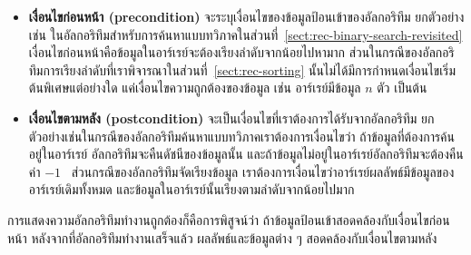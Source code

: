 \begin{itemize}
\item {\bf เงื่อนไข{\wbr}ก่อนหน้า (precondition)}
  จะ{\wbr}ระบุ{\wbr}เงื่อนไข{\wbr}ของ{\wbr}ข้อมูล{\wbr}ป้อน{\wbr}เข้า{\wbr}ของ{\wbr}อัล{\wbr}กอ{\wbr}ริ{\wbr}ทึม ยก{\wbr}ตัวอย่าง{\wbr}เช่น{\wbr}
  ใน{\wbr}อัล{\wbr}กอ{\wbr}ริ{\wbr}ทึม{\wbr}สำหรับ{\wbr}การ{\wbr}ค้นหา{\wbr}แบบ{\wbr}ทวิภาค{\wbr}ใน{\wbr}ส่วน{\wbr}ที่~\ref{sect:rec-binary-search-revisited}
  เงื่อนไข{\wbr}ก่อนหน้า{\wbr}คือ{\wbr}ข้อมูล{\wbr}ใน{\wbr}อาร์เรย์{\wbr}จะ{\wbr}ต้อง{\wbr}เรียงลำดับ{\wbr}จาก{\wbr}น้อย{\wbr}ไป{\wbr}หา{\wbr}มาก{\wbr}
  ส่วน{\wbr}ใน{\wbr}กรณี{\wbr}ของ{\wbr}อัล{\wbr}กอ{\wbr}ริ{\wbr}ทึม{\wbr}การ{\wbr}เรียงลำดับ{\wbr}ที่{\wbr}เรา{\wbr}พิจารณา{\wbr}ใน{\wbr}ส่วน{\wbr}ที่~\ref{sect:rec-sorting}
  นั้น{\wbr}ไม่{\wbr}ได้{\wbr}มี{\wbr}การ{\wbr}กำหนด{\wbr}เงื่อนไข{\wbr}เริ่มต้น{\wbr}พิเศษ{\wbr}แต่อย่างใด แค่{\wbr}เงื่อนไข{\wbr}ความ{\wbr}ถูกต้อง{\wbr}ของ{\wbr}ข้อมูล เช่น{\wbr}
  อาร์เรย์มี{\wbr}ข้อมูล $n$ ตัว เป็นต้น{\wbr}
\item {\bf เงื่อนไข{\wbr}ตาม{\wbr}หลัง (postcondition)}
  จะ{\wbr}เป็น{\wbr}เงื่อนไข{\wbr}ที่{\wbr}เรา{\wbr}ต้องการ{\wbr}ได้{\wbr}รับ{\wbr}จาก{\wbr}อัล{\wbr}กอ{\wbr}ริ{\wbr}ทึม{\wbr}
  ยก{\wbr}ตัวอย่าง{\wbr}เช่น{\wbr}ใน{\wbr}กรณี{\wbr}ของ{\wbr}อัล{\wbr}กอ{\wbr}ริ{\wbr}ทึม{\wbr}ค้นหา{\wbr}แบบ{\wbr}ทวิภาค{\wbr}เรา{\wbr}ต้องการ{\wbr}เงื่อนไข{\wbr}ว่า{\wbr}
  ถ้า{\wbr}ข้อมูล{\wbr}ที่{\wbr}ต้องการ{\wbr}ค้น{\wbr}อยู่{\wbr}ใน{\wbr}อาร์เรย์ อัล{\wbr}กอ{\wbr}ริ{\wbr}ทึม{\wbr}จะ{\wbr}คืน{\wbr}ดัชนี{\wbr}ของ{\wbr}ข้อมูล{\wbr}นั้น{\wbr}
  และ{\wbr}ถ้า{\wbr}ข้อมูล{\wbr}ไม่{\wbr}อยู่{\wbr}ใน{\wbr}อาร์เรย์อัล{\wbr}กอ{\wbr}ริ{\wbr}ทึม{\wbr}จะ{\wbr}ต้อง{\wbr}คืน{\wbr}ค่า $-1$
  \ ส่วน{\wbr}กรณี{\wbr}ของ{\wbr}อัล{\wbr}กอ{\wbr}ริ{\wbr}ทึม{\wbr}จัดเรียง{\wbr}ข้อมูล{\wbr}
  เรา{\wbr}ต้องการ{\wbr}เงื่อนไข{\wbr}ว่า{\wbr}อาร์เรย์{\wbr}ผลลัพธ์{\wbr}มี{\wbr}ข้อมูล{\wbr}ของ{\wbr}อาร์เรย์{\wbr}เดิม{\wbr}ทั้งหมด{\wbr}
  และ{\wbr}ข้อมูล{\wbr}ใน{\wbr}อาร์เรย์{\wbr}นั้น{\wbr}เรียง{\wbr}ตาม{\wbr}ลำดับ{\wbr}จาก{\wbr}น้อย{\wbr}ไป{\wbr}มาก{\wbr}
\end{itemize}

การ{\wbr}แสดง{\wbr}ความ{\wbr}อัล{\wbr}กอ{\wbr}ริ{\wbr}ทึม{\wbr}ทำงาน{\wbr}ถูกต้อง{\wbr}ก็{\wbr}คือ{\wbr}การ{\wbr}พิสูจน์{\wbr}ว่า{\wbr}
ถ้า{\wbr}ข้อมูล{\wbr}ป้อน{\wbr}เข้า{\wbr}สอดคล้อง{\wbr}กับ{\wbr}เงื่อนไข{\wbr}ก่อนหน้า หลังจาก{\wbr}ที่{\wbr}อัล{\wbr}กอ{\wbr}ริ{\wbr}ทึม{\wbr}ทำงาน{\wbr}เสร็จ{\wbr}แล้ว{\wbr}
ผลลัพธ์{\wbr}และ{\wbr}ข้อมูล{\wbr}ต่าง ๆ สอดคล้อง{\wbr}กับ{\wbr}เงื่อนไข{\wbr}ตาม{\wbr}หลัง{\wbr}

